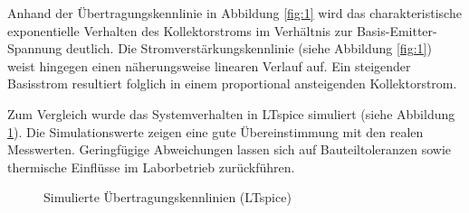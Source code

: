 Anhand der Übertragungskennlinie in Abbildung \ref{fig:1} wird das charakteristische exponentielle Verhalten des Kollektorstroms im Verhältnis zur Basis-Emitter-Spannung deutlich. Die Stromverstärkungskennlinie (siehe Abbildung \ref{fig:1}) weist hingegen einen näherungsweise linearen Verlauf auf. Ein steigender Basisstrom resultiert folglich in einem proportional ansteigenden Kollektorstrom.

Zum Vergleich wurde das Systemverhalten in LTspice simuliert (siehe Abbildung \ref{fig:2}). Die Simulationswerte zeigen eine gute Übereinstimmung mit den realen Messwerten. Geringfügige Abweichungen lassen sich auf Bauteiltoleranzen sowie thermische Einflüsse im Laborbetrieb zurückführen.
\begin{figure}[H]
    \centering
    \caption{Simulierte Übertragungskennlinien (LTspice)}
    \label{fig:2}
\end{figure}

